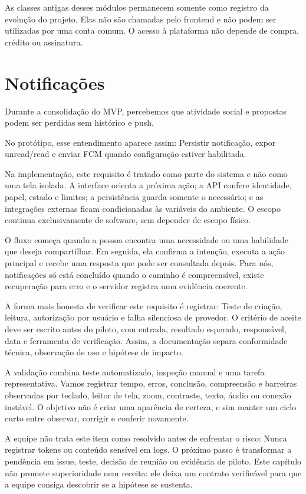 \documentclass[12pt,oneside,a4paper,article]{abntex2}
\begin{document}
As classes antigas desses módulos permanecem somente como registro da evolução do projeto. Elas não são chamadas pelo frontend e não podem ser utilizadas por uma conta comum. O acesso à plataforma não depende de compra, crédito ou assinatura.
\section{Notificações}
Durante a consolidação do MVP, percebemos que atividade social e propostas podem ser perdidas sem histórico e push.

No protótipo, esse entendimento aparece assim: Persistir notificação, expor unread/read e enviar FCM quando configuração estiver habilitada.

Na implementação, este requisito é tratado como parte do sistema e não como uma tela isolada. A interface orienta a próxima ação; a API confere identidade, papel, estado e limites; a persistência guarda somente o necessário; e as integrações externas ficam condicionadas às variáveis do ambiente. O escopo continua exclusivamente de software, sem depender de escopo físico.

O fluxo começa quando a pessoa encontra uma necessidade ou uma habilidade que deseja compartilhar. Em seguida, ela confirma a intenção, executa a ação principal e recebe uma resposta que pode ser consultada depois. Para nós, notificações só está concluído quando o caminho é compreensível, existe recuperação para erro e o servidor registra uma evidência coerente.

A forma mais honesta de verificar este requisito é registrar: Teste de criação, leitura, autorização por usuário e falha silenciosa de provedor. O critério de aceite deve ser escrito antes do piloto, com entrada, resultado esperado, responsável, data e ferramenta de verificação. Assim, a documentação separa conformidade técnica, observação de uso e hipótese de impacto.

A validação combina teste automatizado, inspeção manual e uma tarefa representativa. Vamos registrar tempo, erros, conclusão, compreensão e barreiras observadas por teclado, leitor de tela, zoom, contraste, texto, áudio ou conexão instável. O objetivo não é criar uma aparência de certeza, e sim manter um ciclo curto entre observar, corrigir e conferir novamente.

A equipe não trata este item como resolvido antes de enfrentar o risco: Nunca registrar tokens ou conteúdo sensível em logs. O próximo passo é transformar a pendência em issue, teste, decisão de reunião ou evidência de piloto. Este capítulo não promete superioridade nem receita: ele deixa um contrato verificável para que a equipe consiga descobrir se a hipótese se sustenta.
\end{document}
